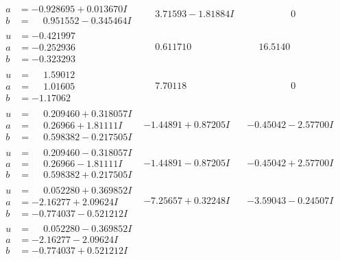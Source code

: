 \documentclass[1p]{elsarticle_modified}
\theoremstyle{definition}
\begin{document}
$$\begin{array}{c|c|c}
\begin{aligned}
a &= -0.928695 + 0.013670 I \\
b &= \phantom{-}0.951552 - 0.345464 I\end{aligned}
 & \phantom{-}3.71593 - 1.81884 I & \phantom{-0.000000 } 0 \\ \hline\begin{aligned}
u &= -0.421997\phantom{ +0.000000I} \\
a &= -0.252936\phantom{ +0.000000I} \\
b &= -0.323293\phantom{ +0.000000I}\end{aligned}
 & \phantom{-}0.611710\phantom{ +0.000000I} & \phantom{-}16.5140\phantom{ +0.000000I} \\ \hline\begin{aligned}
u &= \phantom{-}1.59012\phantom{ +0.000000I} \\
a &= \phantom{-}1.01605\phantom{ +0.000000I} \\
b &= -1.17062\phantom{ +0.000000I}\end{aligned}
 & \phantom{-}7.70118\phantom{ +0.000000I} & \phantom{-0.000000 } 0 \\ \hline\begin{aligned}
u &= \phantom{-}0.209460 + 0.318057 I \\
a &= \phantom{-}0.26966 + 1.81111 I \\
b &= \phantom{-}0.598382 - 0.217505 I\end{aligned}
 & -1.44891 + 0.87205 I & -0.45042 - 2.57700 I \\ \hline\begin{aligned}
u &= \phantom{-}0.209460 - 0.318057 I \\
a &= \phantom{-}0.26966 - 1.81111 I \\
b &= \phantom{-}0.598382 + 0.217505 I\end{aligned}
 & -1.44891 - 0.87205 I & -0.45042 + 2.57700 I \\ \hline\begin{aligned}
u &= \phantom{-}0.052280 + 0.369852 I \\
a &= -2.16277 + 2.09624 I \\
b &= -0.774037 - 0.521212 I\end{aligned}
 & -7.25657 + 0.32248 I & -3.59043 - 0.24507 I \\ \hline\begin{aligned}
u &= \phantom{-}0.052280 - 0.369852 I \\
a &= -2.16277 - 2.09624 I \\
b &= -0.774037 + 0.521212 I\end{aligned}

\end{array}$$
\end{document}
